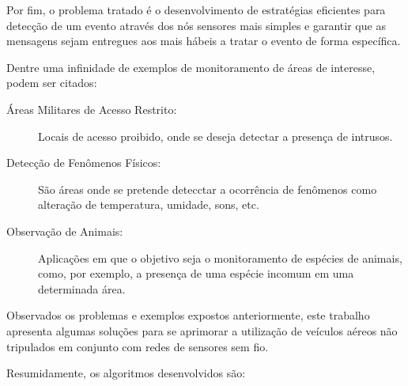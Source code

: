 Por fim, o problema tratado é o desenvolvimento de estratégias eficientes para detecção de um evento através dos
nós sensores mais simples e garantir que as mensagens sejam entregues aos \vants
mais hábeis a tratar o evento de forma específica.

Dentre uma infinidade de exemplos de monitoramento de áreas de interesse,
podem ser citados:

\begin{description}
 \item [Áreas Militares de Acesso Restrito:] Locais de acesso proibido, onde se deseja detectar a presença de intrusos.
 \item [Detecção de Fenômenos Físicos:] São áreas onde se pretende detecctar a ocorrência de fenômenos como alteração de
temperatura, umidade, sons, etc.
 \item [Observação de Animais:] Aplicações em que o objetivo seja o monitoramento de espécies de animais, como, por exemplo,
a presença de uma espécie incomum em uma determinada área.
\end{description}

% 


Observados os problemas e exemplos expostos anteriormente, este trabalho apresenta algumas soluções para se aprimorar
a utilização de veículos aéreos não tripulados em conjunto com redes de sensores sem fio.

Resumidamente, os algoritmos desenvolvidos são:

